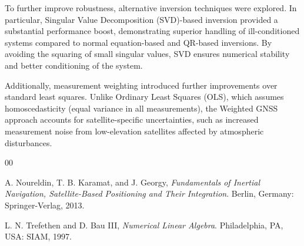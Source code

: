 \documentclass[conference]{IEEEtran}
\begin{document}
To further improve robustness, alternative inversion techniques were explored. In particular, Singular Value Decomposition (SVD)-based inversion provided a substantial performance boost, demonstrating superior handling of ill-conditioned systems compared to normal equation-based and QR-based inversions. By avoiding the squaring of small singular values, SVD ensures numerical stability and better conditioning of the system.

Additionally, measurement weighting introduced further improvements over standard least squares. Unlike Ordinary Least Squares (OLS), which assumes homoscedasticity (equal variance in all measurements), the Weighted GNSS approach accounts for satellite-specific uncertainties, such as increased measurement noise from low-elevation satellites affected by atmospheric disturbances.

\begin{thebibliography}{00}

 A. Noureldin, T. B. Karamat, and J. Georgy, \textit{Fundamentals of Inertial Navigation, Satellite-Based Positioning and Their Integration}. Berlin, Germany: Springer-Verlag, 2013.

 L. N. Trefethen and D. Bau III, \textit{Numerical Linear Algebra}. Philadelphia, PA, USA: SIAM, 1997.


\end{thebibliography}
\end{document}

